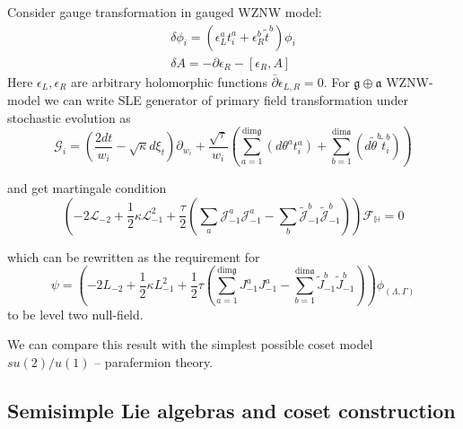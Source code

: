 \documentclass[12pt]{article}
\theoremstyle{definition}
\newcommand{\gf}{\mathfrak{g}}
\newcommand{\af}{\mathfrak{a}}
\theoremstyle{definition} \newtheorem{Def}{Definition}
\begin{document}
Consider gauge transformation in gauged WZNW model:
\begin{eqnarray*}
  \delta \phi_{i}=(\epsilon_{L}^{a} t^{a}_{i}+\epsilon^{b}_{R}\tilde{t}^{b})\phi_{i}\\
  \delta A = -\partial \epsilon_{R}-[\epsilon_{R},A]
\end{eqnarray*}
Here $\epsilon_{L}, \epsilon_{R}$ are arbitrary holomorphic functions $\bar\partial\epsilon_{L,R}=0$. 
For  $\gf\oplus \af$ WZNW-model we can write SLE generator of primary field transformation under stochastic evolution as
\begin{equation*}
  \mathcal{G}_{i}=\left(\frac{2dt}{w_{i}}-\sqrt{\kappa} d\xi_{t}\right) \partial_{w_{i}}+\frac{\sqrt{\tau}}{w_{i}}\left(\sum_{a=1}^{\mathrm{dim} \gf}\left(d \theta ^{a} t^{a}_{i}\right)+\sum_{b=1}^{\mathrm{dim} \af}\left(d \tilde{\theta} ^{b} \tilde{t}^{b}_{i}\right)\right)
\end{equation*}

and get martingale condition
\begin{equation*}
  \left(-2 \mathcal{L}_{-2}+\frac{1}{2}\kappa \mathcal{L}_{-1}^{2}+\frac{\tau}{2}\left( \sum_{a} \mathcal{J}^{a}_{-1} \mathcal{J}^{a}_{-1}-
      \sum_{b}\tilde{\mathcal{J}}^{b}_{-1} \tilde{\mathcal{J}}^{b}_{-1}\right)\right)        \mathcal{F}_{\mathbb{H}}=0
\end{equation*}

which can be rewritten as the requirement for
\begin{equation*}
  \psi=\left(-2L_{-2}+\frac{1}{2}\kappa L_{-1}^{2}+\frac{1}{2}\tau \left(\sum_{a=1}^{\mathrm{dim}\gf}J^{a}_{-1}J^{a}_{-1}-\sum_{b=1}^{\mathrm{dim}\af}\tilde{J}^{b}_{-1}\tilde{J}^{b}_{-1}\right)\right) \phi_{(\Lambda,\Gamma)}
\end{equation*}
to be level two null-field.

We can compare this result with the simplest possible coset model $su(2)/u(1)$ --  parafermion theory.

\subsection{Semisimple Lie algebras and coset construction}
\label{sec:semis-lie-algebr}
\end{document}
